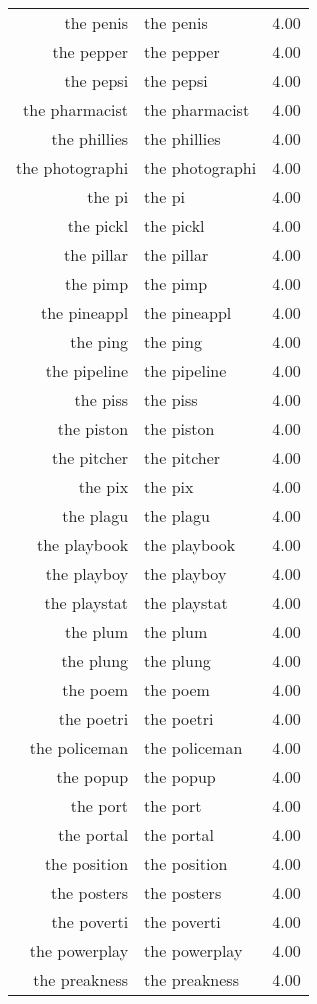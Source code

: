 \begin{table}[ht]
\begin{tabular}{rlr}
  the penis & the penis & 4.00 \\ 
  the pepper & the pepper & 4.00 \\ 
  the pepsi & the pepsi & 4.00 \\ 
  the pharmacist & the pharmacist & 4.00 \\ 
  the phillies & the phillies & 4.00 \\ 
  the photographi & the photographi & 4.00 \\ 
  the pi & the pi & 4.00 \\ 
  the pickl & the pickl & 4.00 \\ 
  the pillar & the pillar & 4.00 \\ 
  the pimp & the pimp & 4.00 \\ 
  the pineappl & the pineappl & 4.00 \\ 
  the ping & the ping & 4.00 \\ 
  the pipeline & the pipeline & 4.00 \\ 
  the piss & the piss & 4.00 \\ 
  the piston & the piston & 4.00 \\ 
  the pitcher & the pitcher & 4.00 \\ 
  the pix & the pix & 4.00 \\ 
  the plagu & the plagu & 4.00 \\ 
  the playbook & the playbook & 4.00 \\ 
  the playboy & the playboy & 4.00 \\ 
  the playstat & the playstat & 4.00 \\ 
  the plum & the plum & 4.00 \\ 
  the plung & the plung & 4.00 \\ 
  the poem & the poem & 4.00 \\ 
  the poetri & the poetri & 4.00 \\ 
  the policeman & the policeman & 4.00 \\ 
  the popup & the popup & 4.00 \\ 
  the port & the port & 4.00 \\ 
  the portal & the portal & 4.00 \\ 
  the position & the position & 4.00 \\ 
  the posters & the posters & 4.00 \\ 
  the poverti & the poverti & 4.00 \\ 
  the powerplay & the powerplay & 4.00 \\ 
  the preakness & the preakness & 4.00 \\ 

\end{tabular}
\end{table}
